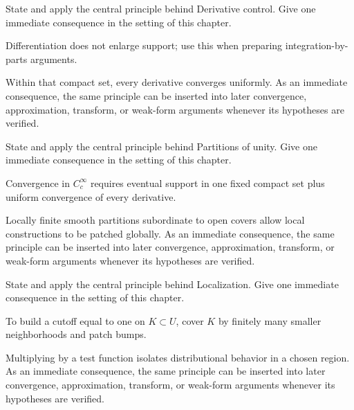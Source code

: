 \begin{exercise}\label{exr:iii15-04}
State and apply the central principle behind Derivative control. Give one immediate consequence in the setting of this chapter.
\end{exercise}
\begin{hint}
Differentiation does not enlarge support; use this when preparing integration-by-parts arguments.
\end{hint}
\begin{solution}
Within that compact set, every derivative converges uniformly. As an immediate consequence, the same principle can be inserted into later convergence, approximation, transform, or weak-form arguments whenever its hypotheses are verified.
\end{solution}

\begin{exercise}\label{exr:iii15-05}
State and apply the central principle behind Partitions of unity. Give one immediate consequence in the setting of this chapter.
\end{exercise}
\begin{hint}
Convergence in \(C_c^\infty\) requires eventual support in one fixed compact set plus uniform convergence of every derivative.
\end{hint}
\begin{solution}
Locally finite smooth partitions subordinate to open covers allow local constructions to be patched globally. As an immediate consequence, the same principle can be inserted into later convergence, approximation, transform, or weak-form arguments whenever its hypotheses are verified.
\end{solution}

\begin{exercise}\label{exr:iii15-06}
State and apply the central principle behind Localization. Give one immediate consequence in the setting of this chapter.
\end{exercise}
\begin{hint}
To build a cutoff equal to one on \(K\subset U\), cover \(K\) by finitely many smaller neighborhoods and patch bumps.
\end{hint}
\begin{solution}
Multiplying by a test function isolates distributional behavior in a chosen region. As an immediate consequence, the same principle can be inserted into later convergence, approximation, transform, or weak-form arguments whenever its hypotheses are verified.
\end{solution}

